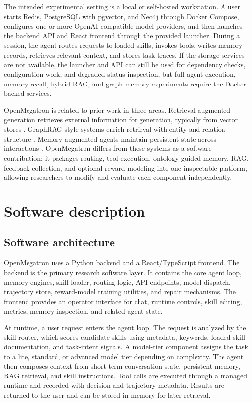 \documentclass[preprint,12pt,a4paper]{elsarticle}
\begin{document}
The intended experimental setting is a local or self-hosted workstation. A user starts Redis, PostgreSQL with pgvector, and Neo4j through Docker Compose, configures one or more OpenAI-compatible model providers, and then launches the backend API and React frontend through the provided launcher. During a session, the agent routes requests to loaded skills, invokes tools, writes memory records, retrieves relevant context, and stores task traces. If the storage services are not available, the launcher and API can still be used for dependency checks, configuration work, and degraded status inspection, but full agent execution, memory recall, hybrid RAG, and graph-memory experiments require the Docker-backed services.

OpenMegatron is related to prior work in three areas. Retrieval-augmented generation retrieves external information for generation, typically from vector stores \cite{lewis2020retrieval}. GraphRAG-style systems enrich retrieval with entity and relation structure \cite{edge2024graphrag}. Memory-augmented agents maintain persistent state across interactions \cite{park2023generative,zhang2024memgpt}. OpenMegatron differs from these systems as a software contribution: it packages routing, tool execution, ontology-guided memory, RAG, feedback collection, and optional reward modeling into one inspectable platform, allowing researchers to modify and evaluate each component independently.

\section{Software description}

\subsection{Software architecture}

OpenMegatron uses a Python backend and a React/TypeScript frontend. The backend is the primary research software layer. It contains the core agent loop, memory engines, skill loader, routing logic, API endpoints, model dispatch, trajectory store, reward-model training utilities, and repair mechanisms. The frontend provides an operator interface for chat, runtime controls, skill editing, metrics, memory inspection, and related agent state.

At runtime, a user request enters the agent loop. The request is analyzed by the skill router, which scores candidate skills using metadata, keywords, loaded skill documentation, and task-intent signals. A model-tier component assigns the task to a lite, standard, or advanced model tier depending on complexity. The agent then composes context from short-term conversation state, persistent memory, RAG retrieval, and skill instructions. Tool calls are executed through a managed runtime and recorded with decision and trajectory metadata. Results are returned to the user and can be stored in memory for later retrieval.
\end{document}
